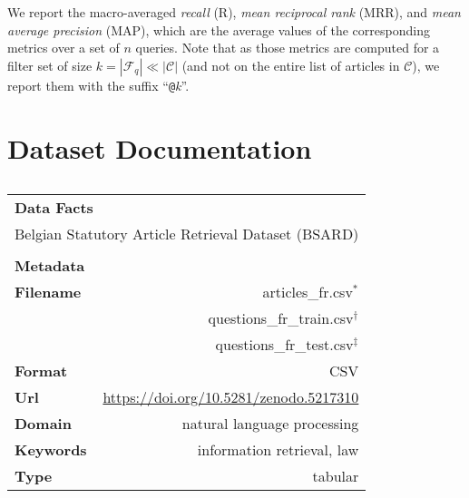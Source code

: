 \documentclass[11pt]{article}
\makeatletter
\newcommand{\at}{\texttt{@}}
\makeatother
\begin{document}
We report the macro-averaged \textit{recall} (R), \textit{mean reciprocal rank} (MRR), and \textit{mean average precision} (MAP), which are the average values of the corresponding metrics over a set of $n$ queries. Note that as those metrics are computed for a filter set of size $k=\left|\mathcal{F}_q\right|\ll|\mathcal{C}|$ (and not on the entire list of articles in $\mathcal{C}$), we report them with the suffix ``\at\textit{k}''.


\section{Dataset Documentation}

\begin{table*}[t]
\centering
\small
\begin{subtable}[t]{.55\linewidth}
\centering
\caption*{}
    \begin{tabular}{|lr|}
        \hline
        \multicolumn{2}{|l|}{\textbf{\Large Data Facts}}                                      \\
        \multicolumn{2}{|l|}{Belgian Statutory Article Retrieval Dataset (BSARD)}             \\ \hline
        \multicolumn{2}{l}{}                                                                  \\ \hline
        \multicolumn{2}{|l|}{\textbf{\large Metadata}}                                        \\ \hline
        \textbf{Filename}    & articles\_fr.csv$^\ast$                                        \\
                             & questions\_fr\_train.csv$^\dagger$                             \\
                             & questions\_fr\_test.csv$^\ddagger$                             \\ \hline
        \textbf{Format}      & CSV                                                            \\ \hline
        \textbf{Url}         & {\scriptsize\url{https://doi.org/10.5281/zenodo.5217310}}  \\ \hline
        \textbf{Domain}      & natural language processing                                    \\ \hline
        \textbf{Keywords}    & information retrieval, law                                     \\ \hline
        \textbf{Type}        & tabular                                                        \\ \hline

\end{tabular}
\end{subtable}
\end{table*}
\end{document}
